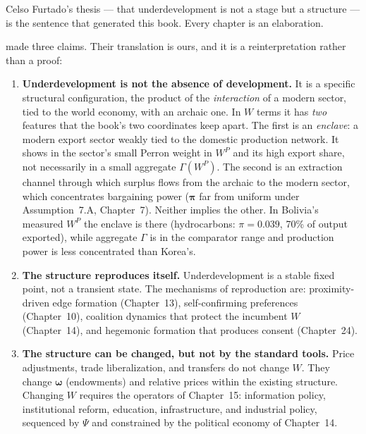 \documentclass[../structural_economics_book.tex]{subfiles}
\begin{document}
Celso Furtado's \citeyear{furtado1961desenvolvimento} thesis --- that underdevelopment is not a stage but a structure --- is the sentence that generated this book. Every chapter is an elaboration.

\begin{remark}\label{ch28:prop:furtado}
\citet{furtado1961desenvolvimento} made three claims. Their translation is ours, and it is a reinterpretation rather than a proof:
\begin{enumerate}
\item \textbf{Underdevelopment is not the absence of development.} It is a specific structural configuration, the product of the \emph{interaction} of a modern sector, tied to the world economy, with an archaic one. In $W$ terms it has \emph{two} features that the book's two coordinates keep apart. The first is an \emph{enclave}: a modern export sector weakly tied to the domestic production network. It shows in the sector's small Perron weight in $W^P$ and its high export share, not necessarily in a small aggregate $\Gamma(W^P)$. The second is an extraction channel through which surplus flows from the archaic to the modern sector, which concentrates bargaining power ($\boldsymbol{\pi}$ far from uniform under Assumption~7.A, Chapter~7). Neither implies the other. In Bolivia's measured $W^P$ the enclave is there (hydrocarbons: $\pi = 0.039$, 70\% of output exported), while aggregate $\Gamma$ is in the comparator range and production power is less concentrated than Korea's.

\item \textbf{The structure reproduces itself.} Underdevelopment is a stable fixed point, not a transient state. The mechanisms of reproduction are: proximity-driven edge formation (Chapter~13), self-confirming preferences (Chapter~10), coalition dynamics that protect the incumbent $W$ (Chapter~14), and hegemonic formation that produces consent (Chapter~24).

\item \textbf{The structure can be changed, but not by the standard tools.} Price adjustments, trade liberalization, and transfers do not change $W$. They change $\boldsymbol{\omega}$ (endowments) and relative prices within the existing structure. Changing $W$ requires the operators of Chapter~15: information policy, institutional reform, education, infrastructure, and industrial policy, sequenced by $\Psi$ and constrained by the political economy of Chapter~14.
\end{enumerate}


\end{remark}
\end{document}
